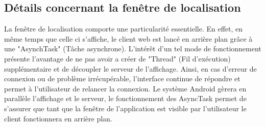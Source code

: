 \subsection{Détails concernant la fenêtre de localisation}

	La fenêtre de localisation comporte une particularité essentielle. En effet, en même temps que celle ci s'affiche, le client web est lancé en arrière plan grâce à une "AsynchTask" (Tâche asynchrone). L'intérêt d'un tel mode de fonctionnement présente l'avantage de ne pas avoir a créer de "Thread" (Fil d'exécution) supplémentaire et de découpler le serveur de l'affichage. Ainsi, en cas d'erreur de connexion ou de problème irrécupérable, l'interface continue de répondre et permet à l'utilisateur de relancer la connexion. Le système Android gèrera en parallèle l'affichage et le serveur, le fonctionnement des AsyncTask permet de s'assurer que tant que la fenêtre de l'application est visible par l'utilisateur le client fonctionnera en arrière plan.
	
	 

	

